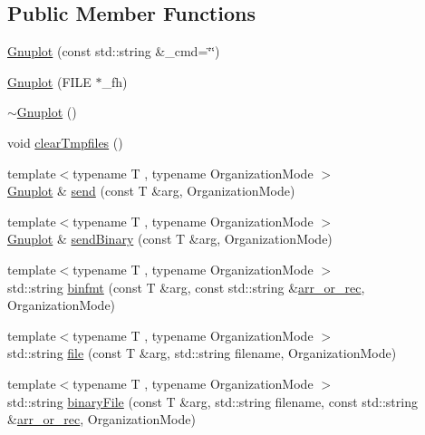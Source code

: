 \subsection*{Public Member Functions}
\begin{DoxyCompactItemize}
\item 
\hyperlink{classgnuplotio_1_1_gnuplot_ab2fb14389ab63ad5d9b2e57169bbbf1d}{Gnuplot} (const std\+::string \&\+\_\+cmd=\char`\"{}\char`\"{})
\item 
\hyperlink{classgnuplotio_1_1_gnuplot_a4a4f48a548e6ce6d485ca0a868410078}{Gnuplot} (F\+I\+LE $\ast$\+\_\+fh)
\item 
\hyperlink{classgnuplotio_1_1_gnuplot_ad10824df011e645542b5f97a903f4c31}{$\sim$\+Gnuplot} ()
\item 
void \hyperlink{classgnuplotio_1_1_gnuplot_a0d62f80988c3db4413a668e366406393}{clear\+Tmpfiles} ()
\item 
{\footnotesize template$<$typename T , typename Organization\+Mode $>$ }\\\hyperlink{classgnuplotio_1_1_gnuplot}{Gnuplot} \& \hyperlink{classgnuplotio_1_1_gnuplot_ae3f4c07960aa5601cc72158be67f945c}{send} (const T \&arg, Organization\+Mode)
\item 
{\footnotesize template$<$typename T , typename Organization\+Mode $>$ }\\\hyperlink{classgnuplotio_1_1_gnuplot}{Gnuplot} \& \hyperlink{classgnuplotio_1_1_gnuplot_a46c9e01d2030768cd811d2e8dbd10dfa}{send\+Binary} (const T \&arg, Organization\+Mode)
\item 
{\footnotesize template$<$typename T , typename Organization\+Mode $>$ }\\std\+::string \hyperlink{classgnuplotio_1_1_gnuplot_a43fe103649ec168b453c43aecdacce81}{binfmt} (const T \&arg, const std\+::string \&\hyperlink{classgnuplotio_1_1_gnuplot_a2d194dbd4d2f3475ff6f9b8384e62a9f}{arr\+\_\+or\+\_\+rec}, Organization\+Mode)
\item 
{\footnotesize template$<$typename T , typename Organization\+Mode $>$ }\\std\+::string \hyperlink{classgnuplotio_1_1_gnuplot_a9b9980e3b3d7cbb233a989e27468fa55}{file} (const T \&arg, std\+::string filename, Organization\+Mode)
\item 
{\footnotesize template$<$typename T , typename Organization\+Mode $>$ }\\std\+::string \hyperlink{classgnuplotio_1_1_gnuplot_ad90501e6dbab5379abcd76fd0e2e4ef1}{binary\+File} (const T \&arg, std\+::string filename, const std\+::string \&\hyperlink{classgnuplotio_1_1_gnuplot_a2d194dbd4d2f3475ff6f9b8384e62a9f}{arr\+\_\+or\+\_\+rec}, Organization\+Mode)

\end{DoxyCompactItemize}
